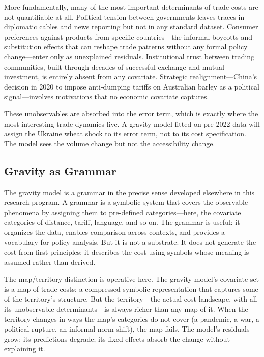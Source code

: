 \documentclass[12pt]{article}
\begin{document}
More fundamentally, many of the most important determinants of trade costs are not quantifiable at all. Political tension between governments leaves traces in diplomatic cables and news reporting but not in any standard dataset. Consumer preferences against products from specific countries---the informal boycotts and substitution effects that can reshape trade patterns without any formal policy change---enter only as unexplained residuals. Institutional trust between trading communities, built through decades of successful exchange and mutual investment, is entirely absent from any covariate. Strategic realignment---China's decision in 2020 to impose anti-dumping tariffs on Australian barley as a political signal---involves motivations that no economic covariate captures.

These unobservables are absorbed into the error term, which is exactly where the most interesting trade dynamics live. A gravity model fitted on pre-2022 data will assign the Ukraine wheat shock to its error term, not to its cost specification. The model sees the volume change but not the accessibility change.

\subsection{Gravity as Grammar}

The gravity model is a grammar in the precise sense developed elsewhere in this research program. A grammar is a symbolic system that covers the observable phenomena by assigning them to pre-defined categories---here, the covariate categories of distance, tariff, language, and so on. The grammar is useful: it organizes the data, enables comparison across contexts, and provides a vocabulary for policy analysis. But it is not a substrate. It does not generate the cost from first principles; it describes the cost using symbols whose meaning is assumed rather than derived.

The map/territory distinction is operative here. The gravity model's covariate set is a map of trade costs: a compressed symbolic representation that captures some of the territory's structure. But the territory---the actual cost landscape, with all its unobservable determinants---is always richer than any map of it. When the territory changes in ways the map's categories do not cover (a pandemic, a war, a political rupture, an informal norm shift), the map fails. The model's residuals grow; its predictions degrade; its fixed effects absorb the change without explaining it.
\end{document}
